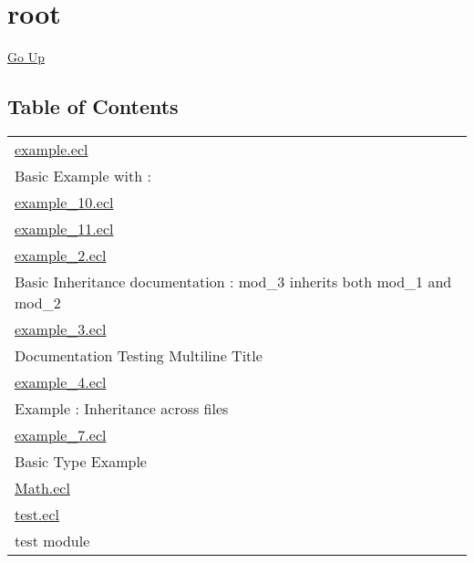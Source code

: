\chapter*{\color{headtoc} root}
\hypertarget{ecldoc:toc:root}{}
\hyperlink{ecldoc:toc:}{Go Up}


\section*{Table of Contents}
{\renewcommand{\arraystretch}{1.5}
\begin{longtable}{|p{\textwidth}|}
\hline
\hyperlink{ecldoc:toc:example}{example.ecl} \\
Basic Example with : \\
\hline
\hyperlink{ecldoc:toc:example_10}{example\_10.ecl} \\
\hline
\hyperlink{ecldoc:toc:example_11}{example\_11.ecl} \\
\hline
\hyperlink{ecldoc:toc:example_2}{example\_2.ecl} \\
Basic Inheritance documentation : mod\_3 inherits both mod\_1 and mod\_2 \\
\hline
\hyperlink{ecldoc:toc:example_3}{example\_3.ecl} \\
Documentation Testing Multiline Title \\
\hline
\hyperlink{ecldoc:toc:example_4}{example\_4.ecl} \\
Example : Inheritance across files \\
\hline
\hyperlink{ecldoc:toc:example_7}{example\_7.ecl} \\
Basic Type Example \\
\hline
\hyperlink{ecldoc:toc:Math}{Math.ecl} \\
\hline
\hyperlink{ecldoc:toc:test}{test.ecl} \\
test module \\
\hline
\end{longtable}
}










